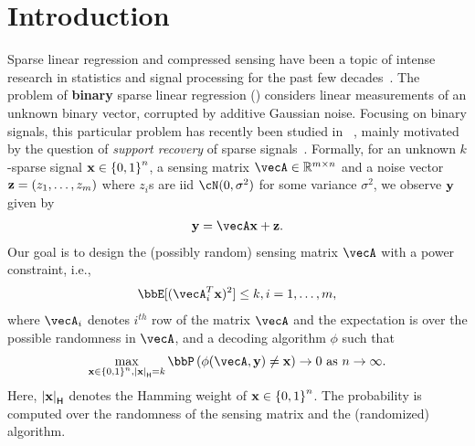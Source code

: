 \section{Introduction}\label{sec:intro}
Sparse linear regression and compressed sensing have been a topic of intense research in statistics and signal processing for the past few decades~\cite{candes2006robust,donoho2006compressed,tibshirani1996regression}.
The problem of \textbf{binary} sparse linear regression (\spl) considers linear measurements of an unknown binary vector, corrupted by additive Gaussian noise. Focusing on binary signals, this particular problem has recently been studied in ~\cite{david2017high,gamarnik2017sparse,gamarnik2022sparse,pmlr-v99-reeves19a}, mainly motivated by the question of {\em support recovery} of sparse signals~\cite{wainwright2009sharp}. Formally, for an unknown $k$-sparse signal $\mathbf{x}\in \left\{0,1\right\}^n$, a sensing matrix $\vecA\in \reals^{m\times n}$ and a noise vector $\mathbf{z} = (z_1, \ldots, z_m)$ where $z_i$s are iid $\cN(0, \sigma^2)$ for some variance $\sigma^2$, we observe $\mathbf{y}$ given by 
\begin{align}
    \by = \vecA \bx + \bz.\label{eq:spl}
\end{align} 
Our goal is to design the (possibly random) sensing matrix $\vecA$ with a power constraint, i.e., 
\begin{align}
  \bbE[(\vecA_i^T \bx)^2] \leq k, i =1, \dots, m,\label{eq:power_constraint}   
\end{align}
where {$\vecA_i$ denotes $i^{th}$ row of the matrix $\vecA$ and} the expectation is over the possible randomness in $\vecA$, and a decoding algorithm $\phi$ such that
\begin{align}
\max_{\bx\in\inb{0,1}^n, \wh{\bx} = k}\bbP\inp{\phi(\vecA, \by) \neq \bx}\rightarrow 0 \text{ as } n\rightarrow \infty.\label{eq:pe_spl}
\end{align} 
Here, ${\left|\mathbf{x}\right|}_{\mathsf{H}}$ denotes the Hamming weight of $\mathbf{x}\in \left\{0,1\right\}^n$. The probability is computed over the randomness of the sensing matrix and the (randomized) algorithm. 


